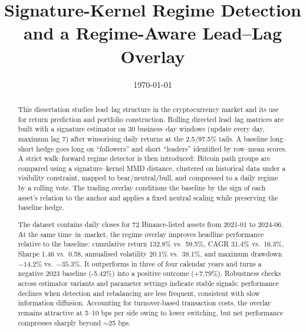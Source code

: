 \documentclass{ecsthesis}      %
\begin{document}
\frontmatter
\title      {Signature-Kernel Regime Detection and a Regime-Aware Lead–Lag Overlay}

\date       {\today}
\examiner {}

\subject    {Mathemetics}
\keywords   {}
\maketitle
\begin{abstract}

This dissertation studies lead--lag structure in the cryptocurrency market and its use for return prediction and portfolio construction. Rolling directed lead--lag matrices are built with a signature estimator on 30 business–day windows (update every day, maximum lag 7) after winsorising daily returns at the 2.5/97.5\% tails. A baseline long–short hedge goes long on “followers” and short “leaders” identified by row–mean scores. A strict walk–forward regime detector is then introduced: Bitcoin path groups are compared using a signature–kernel MMD distance, clustered on historical data under a visibility constraint, mapped to bear/neutral/bull, and compressed to a daily regime by a rolling vote. The trading overlay conditions the baseline by the sign of each asset’s relation to the anchor and applies a fixed neutral scaling while preserving the baseline hedge.

The dataset contains daily closes for 72 Binance-listed assets from 2021-01 to 2024-06. At the same time–in–market, the regime overlay improves headline performance relative to the baseline: cumulative return 132.8\% vs.\ 59.5\%, CAGR 31.4\% vs.\ 16.3\%, Sharpe 1.46 vs.\ 0.58, annualised volatility 20.1\% vs.\ 38.1\%, and maximum drawdown $-14.2\%$ vs.\ $-35.3\%$. It outperforms in three of four calendar years and turns a negative 2023 baseline (-5.42\%) into a positive outcome (+7.79\%). Robustness checks across estimator variants and parameter settings indicate stable signals; performance declines when detection and rebalancing are less frequent, consistent with slow information diffusion. Accounting for turnover-based transaction costs, the overlay remains attractive at 5--10 bps per side owing to lower switching, but net performance compresses sharply beyond $\sim$25 bps.


\end{abstract}
\end{document}

